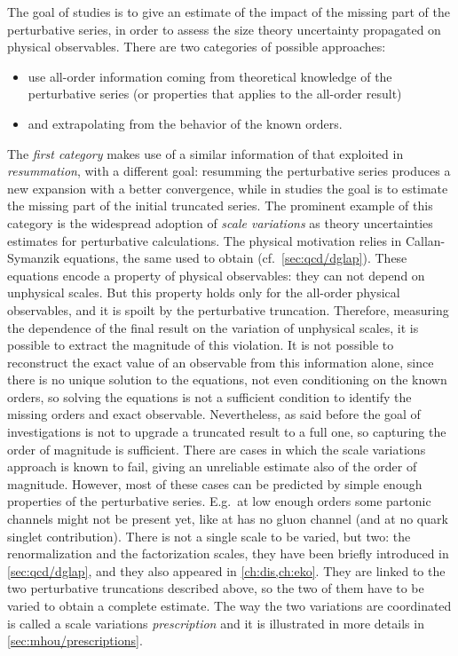 
The goal of \mhou studies is to give an estimate of the impact of the missing
part of the perturbative series, in order to assess the size theory uncertainty
propagated on physical observables.
%
There are two categories of possible approaches: 
\begin{itemize}
  \item use all-order information coming from theoretical knowledge of the
    perturbative series (or properties that applies to the all-order result)
  \item and extrapolating from the behavior of the known orders.
\end{itemize}

The \textit{first category} makes use of a similar information of that
exploited in \textit{resummation}, with a different goal: resumming the
perturbative series produces a new expansion with a better convergence, while
in \mhou studies the goal is to estimate the missing part of the initial
truncated series.
%
The prominent example of this category is the widespread adoption of
\textit{scale variations} as theory uncertainties estimates for perturbative
calculations.
The physical motivation relies in Callan-Symanzik equations, the same used to
obtain \dglap (cf.\ \cref{sec:qcd/dglap}).
%
These equations encode a property of physical observables: they can not depend
on unphysical scales.
But this property holds only for the all-order physical observables, and it is
spoilt by the perturbative truncation.
Therefore, measuring the dependence of the final result on the variation of
unphysical scales, it is possible to extract the magnitude of this violation. 
%
It is not possible to reconstruct the exact value of an observable from this
information alone, since there is no unique solution to the equations, not even
conditioning on the known orders, so solving the equations is not a sufficient
condition to identify the missing orders and exact observable.
%
Nevertheless, as said before the goal of \mhou investigations is not to upgrade
a truncated result to a full one, so capturing the order of magnitude is
sufficient.
%
There are cases in which the scale variations approach is known to fail, giving
an unreliable estimate also of the order of magnitude.
However, most of these cases can be predicted by simple enough properties of
the perturbative series.
E.g.\ at low enough orders some partonic channels might not be present yet,
like \dis at \lo has no gluon channel (and at \nlo no quark singlet
contribution).
%
There is not a single scale to be varied, but two: the renormalization and the
factorization scales, they have been briefly introduced in
\cref{sec:qcd/dglap}, and they also appeared in \cref{ch:dis,ch:eko}.
They are linked to the two perturbative truncations described above, so the two
of them have to be varied to obtain a complete estimate.
The way the two variations are coordinated is called a scale variations
\textit{prescription} and it is illustrated in more details in
\cref{sec:mhou/prescriptions}. 

